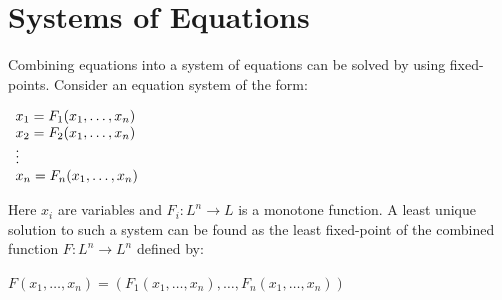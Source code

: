 \section{Systems of Equations}\label{theory:fixedpoint:systemsofequations}
Combining equations into a system of equations can be solved by using fixed-points.
Consider an equation system of the form:

$
\begin{array}{l c l}
x_1 = F_1(x_1, \dots, x_n) \\
x_2 = F_2(x_1, \dots, x_n)\\
\vdots\\
x_n = F_n(x_1, \dots, x_n)\\
\end{array}
$

Here $x_i$ are variables and $F_i: L^n \rightarrow L$ is a monotone function.
A least unique solution to such a system can be found as the least fixed-point of the combined function $F : L^n \rightarrow L^n$ defined by:

$F(x_1, \dots, x_n) = (F_1(x_1, \dots, x_n), \dots, F_n(x_1, \dots, x_n)) $
